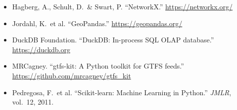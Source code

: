 \documentclass[11pt]{article}
\begin{document}
\begin{itemize}[leftmargin=*,itemsep=0pt]
    \item Hagberg, A., Schult, D.\ \& Swart, P. ``NetworkX.'' \url{https://networkx.org/}
    \item Jordahl, K.\ et al. ``GeoPandas.'' \url{https://geopandas.org/}
    \item DuckDB Foundation. ``DuckDB: In-process SQL OLAP database.'' \url{https://duckdb.org}
    \item MRCagney. ``gtfs-kit: A Python toolkit for GTFS feeds.'' \url{https://github.com/mrcagney/gtfs_kit}
    \item Pedregosa, F.\ et al. ``Scikit-learn: Machine Learning in Python.'' \textit{JMLR}, vol.\ 12, 2011.
\end{itemize}
\end{document}
